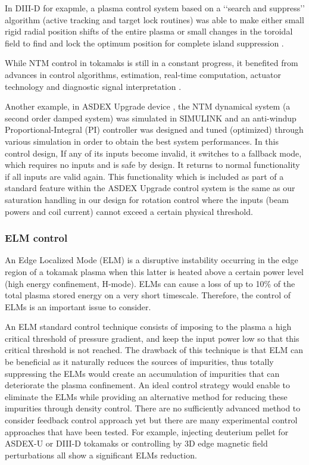 \documentclass[12pt,lot, lof]{puthesis}
\begin{document}
In DIII-D for exapmle, a plasma control system based on a ‘‘search and suppress’’ algorithm (active tracking and target lock routines) was able to make either small rigid radial position shifts of the entire plasma or small changes in the toroidal field to find and lock the optimum position for complete island suppression  \cite{Haye02}. 

While NTM control in tokamaks is still in a constant progress, it benefited from advances in control algorithms, estimation, real-time computation, actuator technology and diagnostic signal interpretation \cite{Bongers09, Volpe09, Zohm07}.

Another example, in ASDEX Upgrade device \cite{Rapson13, Rapson14}, the NTM dynamical system (a second order damped system) was simulated in SIMULINK and an anti-windup Proportional-Integral (PI) controller was designed and tuned (optimized) through various simulation in order to obtain the best system performances. 
In this control design, If any of its inputs become invalid, it switches to a fallback mode, which requires no inputs and is safe by design. It returns to normal functionality if all inputs are valid again. This functionality which is included as part of a standard feature within the ASDEX Upgrade control system is the same as our saturation handling in our design for rotation control where the inputs (beam powers and coil current) cannot exceed a certain physical threshold.

\subsubsection{ELM control}
An Edge Localized Mode (ELM) is a disruptive instability occurring in the edge region of a tokamak plasma when this latter is heated above a certain power level (high energy confinement, H-mode). ELMs can cause a loss of up to 10\% of the total plasma stored energy on a very short timescale. Therefore, the control of ELMs is an important issue to consider.

An ELM standard control technique consists of imposing to the plasma a high critical threshold of pressure gradient, and keep the input power low so that this critical threshold is not reached.
The drawback of this technique is that ELM can be beneficial as it naturally reduces the sources of impurities, thus totally suppressing the ELMs would create an accumulation of impurities that can deteriorate the plasma confinement.
An ideal control strategy would enable to eliminate the ELMs while providing an alternative method for reducing these impurities through density control. There are no sufficiently advanced method to consider feedback control approach yet but there are many experimental control approaches that have been tested. For example, injecting deuterium pellet for ASDEX-U or DIII-D tokamaks \cite{Kallenbach05, Loarte14} or controlling by 3D edge magnetic field perturbations \cite{ Loarte14}  all show a significant ELMs reduction. 
\end{document}

